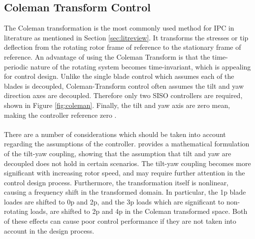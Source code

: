 \subsection{Coleman Transform Control}
The Coleman transformation is the most commonly used method for IPC in literature as mentioned in Section \ref{sec:litreview}. It transforms the stresses or tip deflection from the rotating rotor frame of reference to the stationary frame of reference. An advantage of using the Coleman Transform is that the time-periodic nature of the rotating system becomes time-invariant, which is appealing for control design. Unlike the single blade control which assumes each of the blades is decoupled, Coleman-Transform control often assumes the tilt and yaw direction axes are decoupled. Therefore only two SISO controllers are required, shown in Figure \ref{fig:coleman}. Finally, the tilt and yaw axis are zero mean, making the controller reference zero \citep{19_Lio}. \\~\\
There are a number of considerations which should be taken into account regarding the assumptions of the controller. \citet{1_Lu} provides a mathematical formulation of the tilt-yaw coupling, showing that the assumption that tilt and yaw are decoupled does not hold in certain scenarios. The tilt-yaw coupling becomes more significant with increasing rotor speed, and may require further attention in the control design process. Furthermore, the transformation itself is nonlinear, causing a frequency shift in the transformed domain. In particular, the 1p blade loades are shifted to 0p and 2p, and the 3p loads which are significant to non-rotating loads, are shifted to 2p and 4p in the Coleman transformed space. Both of these effects can cause poor control performance if they are not taken into account in the design process.
